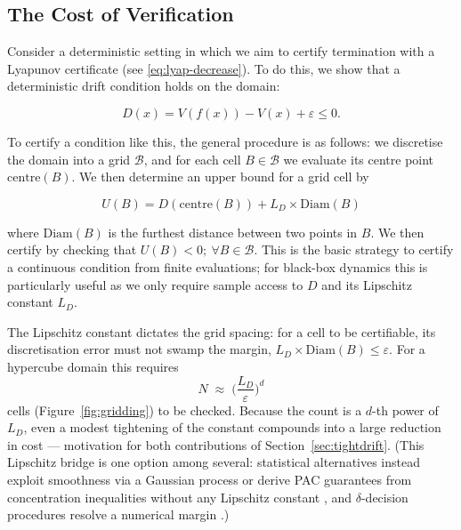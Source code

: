 \subsection{The Cost of Verification}
\label{subsec:gridding}

Consider a deterministic setting in which we aim to certify termination with a Lyapunov certificate (see \eqref{eq:lyap-decrease}). To do this, we show that a deterministic drift condition holds on the domain:

\begin{equation}
\label{eq:det-drift}
    D(x) = V(f(x)) - V(x) + \varepsilon \le 0.
\end{equation}

To certify a condition like this, the general procedure is as follows: we discretise the domain into a grid $\mathcal{B}$, and for each cell $B \in \mathcal{B}$ we evaluate its centre point $\mathrm{centre}(B)$. We then determine an upper bound for a grid cell by

\begin{equation}
\label{eq:disc-err}
    U(B) = D(\mathrm{centre}(B)) + L_D \times \mathrm{Diam}(B)
\end{equation}

where $\mathrm{Diam}(B)$ is the furthest distance between two points in $B$. We then certify by checking that $U(B) < 0 ;\: \forall B \in \mathcal{B}$. This is the basic strategy to certify a continuous condition from finite evaluations; for black-box dynamics this is particularly useful as we only require sample access to $D$ and its Lipschitz constant $L_D$.

The Lipschitz constant dictates the grid spacing: for a cell to be certifiable, its discretisation error must not swamp the margin, $L_D \times \mathrm{Diam}(B) \le \varepsilon$. For a hypercube domain this requires
\begin{equation}
\label{eq:boxcount}
    N \;\approx\; \Big(\frac{L_D}{\varepsilon}\Big)^{d}
\end{equation}
cells (Figure~\ref{fig:gridding}) to be checked. Because the count is a $d$-th power of $L_D$, even a modest tightening of the constant compounds into a large reduction in cost --- motivation for both contributions of Section~\ref{sec:tightdrift}. (This Lipschitz bridge is one option among several: statistical alternatives instead exploit smoothness via a Gaussian process \cite{bortolussi2016smoothed} or derive PAC guarantees from concentration inequalities without any Lipschitz constant \cite{wu2025pac}, and $\delta$-decision procedures resolve a numerical margin \cite{gao2012delta}.)

